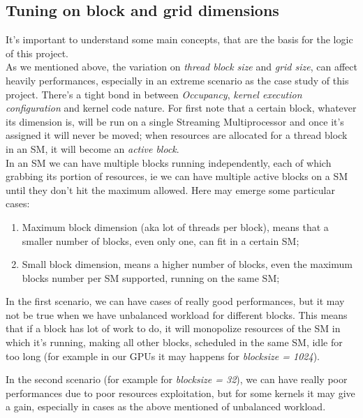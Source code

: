 \subsection{Tuning on block and grid dimensions}
	It's important to understand some main concepts, that are the basis for the logic of this project.\\
	As we mentioned above, the variation on \textit{thread block size} and \textit{grid size}, can affect heavily performances, especially in an extreme scenario as the case study of this project.
	There's a tight bond in between \textit{Occupancy}, \textit{kernel execution configuration} and kernel code nature.
	For first note that a certain block, whatever its dimension is, will be run on a single Streaming Multiprocessor and once it's assigned it will never be moved; when resources are allocated for a thread block in an SM, it will become an \textit{active block}.\\
	In an SM we can have multiple blocks running independently, each of which grabbing its portion of resources, ie we can have multiple active blocks on a SM until they don't hit the maximum allowed.
	Here may emerge some particular cases:
	\begin{enumerate}
		\item Maximum block dimension (aka lot of threads per block), means that a smaller number of blocks, even only one, can fit in a certain SM;
		\item Small block dimension, means a higher number of blocks, even the maximum blocks number per SM supported, running on the same SM;
	\end{enumerate}
	
	In the first scenario, we can have cases of really good performances, but it may not be true when we have unbalanced workload for different blocks. This means that if a block has lot of work to do, it will monopolize resources of the SM in which it's running, making all other blocks, scheduled in the same SM, idle for too long (for example in our GPUs it may happens for \textit{blocksize = 1024}). 
	
	In the second scenario (for example for \textit{blocksize = 32}), we can have really poor performances due to poor resources exploitation, but for some kernels it may give a gain, especially in cases as the above mentioned of unbalanced workload.
	
